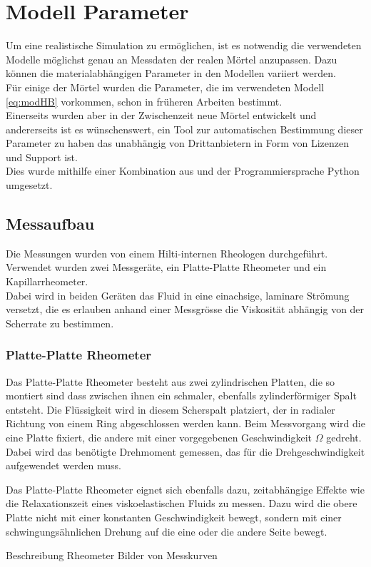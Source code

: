 \section{Modell Parameter}
\label{Kapitel:Parameter}
Um eine realistische Simulation zu ermöglichen, ist es notwendig die verwendeten Modelle möglichst genau an Messdaten der realen Mörtel anzupassen. Dazu können die materialabhängigen Parameter in den Modellen variiert werden.\\
Für einige der Mörtel wurden die Parameter, die im verwendeten Modell \eqref{eq:modHB} vorkommen, schon in früheren Arbeiten bestimmt. \\
Einerseits wurden aber in der Zwischenzeit neue Mörtel entwickelt und andererseits ist es wünschenswert, ein Tool zur automatischen Bestimmung dieser Parameter zu haben das unabhängig von Drittanbietern in Form von Lizenzen und Support ist. \\
Dies wurde mithilfe einer Kombination aus \openfoam{} und der Programmiersprache Python umgesetzt.
%
\subsection{Messaufbau}
Die Messungen wurden von einem Hilti-internen Rheologen durchgeführt. Verwendet wurden zwei Messgeräte, ein Platte-Platte Rheometer und ein Kapillarrheometer.\\
Dabei wird in beiden Geräten das Fluid in eine einachsige, laminare Strömung versetzt, die es erlauben anhand einer Messgrösse die Viskosität abhängig von der Scherrate zu bestimmen.
%
\subsubsection{Platte-Platte Rheometer}
\label{Kapitel:Parameter:PlattePlatteRheo}
Das Platte-Platte Rheometer besteht aus zwei zylindrischen Platten, die so montiert sind dass zwischen ihnen ein schmaler, ebenfalls zylinderförmiger Spalt entsteht. 
Die Flüssigkeit wird in diesem Scherspalt platziert, der in radialer Richtung von einem Ring abgeschlossen werden kann. Beim Messvorgang wird die eine Platte fixiert, die andere mit einer vorgegebenen Geschwindigkeit $\Omega$ gedreht.
Dabei wird das benötigte Drehmoment gemessen, das für die Drehgeschwindigkeit aufgewendet werden muss.

Das Platte-Platte Rheometer eignet sich ebenfalls dazu, zeitabhängige Effekte wie die Relaxationszeit eines viskoelastischen Fluids zu messen. 
Dazu wird die obere Platte nicht mit einer konstanten Geschwindigkeit bewegt, sondern mit einer schwingungsähnlichen Drehung auf die eine oder die andere Seite bewegt.
%
\begin{todocontent}
    \1 Beschreibung Rheometer
    \1 Bilder von Messkurven
\end{todocontent}
%
